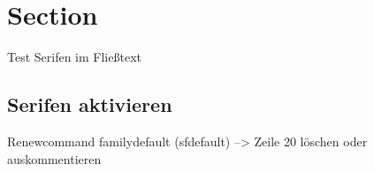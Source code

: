 \documentclass[a4paper,11pt]{scrartcl}
\begin{document}

\section{Section}
Test Serifen im Fließtext

\subsection{Serifen aktivieren}
Renewcommand familydefault (sfdefault) --> Zeile 20 löschen oder auskommentieren



\end{document}
